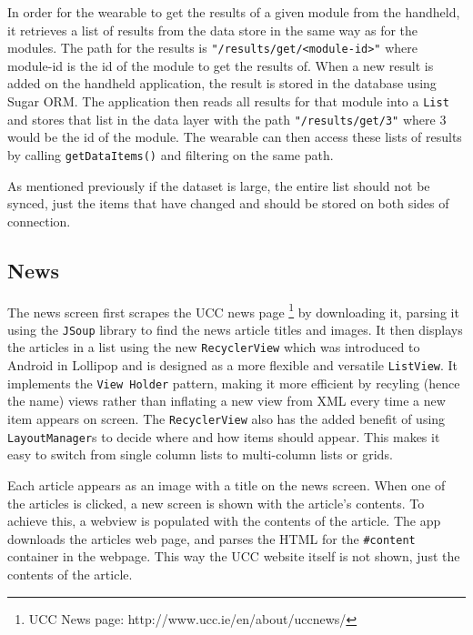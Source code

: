 In order for the wearable to get the results of a given module from the
handheld, it retrieves a list of results from the data store in the same way
as for the modules. The path for the results is
\texttt{"/results/get/<module-id>"} where module-id is the id of the module to
get the results of. When a new result is added on the handheld application, the
result is stored in the database using Sugar ORM. The application then reads all
results for that module into a \texttt{List} and stores that list in the data
layer with the path \texttt{"/results/get/3"} where 3 would be the id of the
module. The wearable can then access these lists of results by calling
\texttt{getDataItems()} and filtering on the same path.

As mentioned previously if the dataset is large, the entire list should not be
synced, just the items that have changed and should be stored on both sides of
connection.


\subsection{News}

The news screen first scrapes the UCC news page
\footnote{UCC News page: http://www.ucc.ie/en/about/uccnews/} by downloading it,
parsing it using the \texttt{JSoup} library to find the news article titles and
images. It then displays the articles in a list using the new
\texttt{RecyclerView} which was introduced to Android in Lollipop and is
designed as a more flexible and versatile \texttt{ListView}. It implements the
\texttt{View Holder} pattern, making it more efficient by recyling (hence the
name) views rather than inflating a new view from XML every time a new item
appears on screen. The \texttt{RecyclerView} also has the added benefit of using
\texttt{LayoutManager}s to decide where and how items should appear. This makes
it easy to switch from single column lists to multi-column lists or grids.

Each article appears as an image with a title on the news screen. When one of
the articles is clicked, a new screen is shown with the article's contents. To
achieve this, a webview is populated with the contents of the article. The app
downloads the articles web page, and parses the HTML for the \texttt{\#content}
container in the webpage. This way the UCC website itself is not shown, just
the contents of the article.

